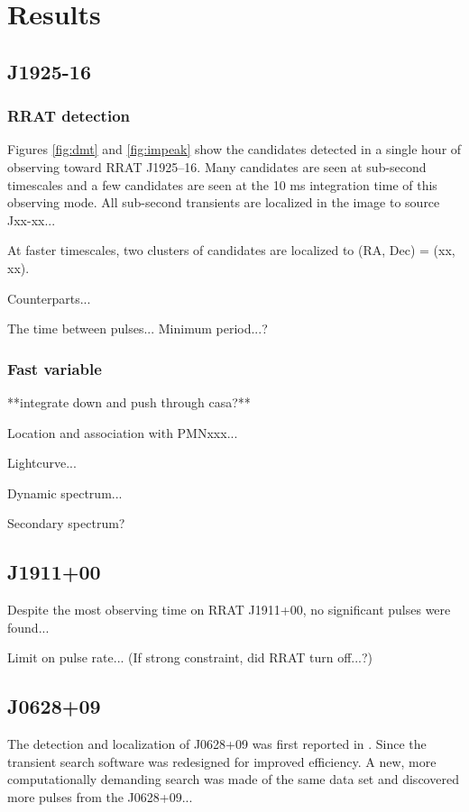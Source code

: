 \section{Results}

\subsection{J1925-16}
\subsubsection{RRAT detection}
\label{rrat1925}

Figures \ref{fig:dmt} and \ref{fig:impeak} show the candidates detected in a single hour of observing toward RRAT J1925--16. Many candidates are seen at sub-second timescales and a few candidates are seen at the 10 ms integration time of this observing mode. All sub-second transients are localized in the image to source Jxx-xx...

At faster timescales, two clusters of candidates are localized to (RA, Dec) = (xx, xx). 

Counterparts...

The time between pulses... Minimum period...?

\subsubsection{Fast variable}
\label{fast}

**integrate down and push through casa?**

Location and association with PMNxxx...

Lightcurve...

Dynamic spectrum...

Secondary spectrum?

\subsection{J1911+00}

Despite the most observing time on RRAT J1911+00, no significant pulses were found...

Limit on pulse rate...
(If strong constraint, did RRAT turn off...?)

\subsection{J0628+09}

The detection and localization of J0628+09 was first reported in \cite{Law_2012}. Since the transient search software was redesigned for improved efficiency. A new, more computationally demanding search was made of the same data set and discovered more pulses from the J0628+09...

